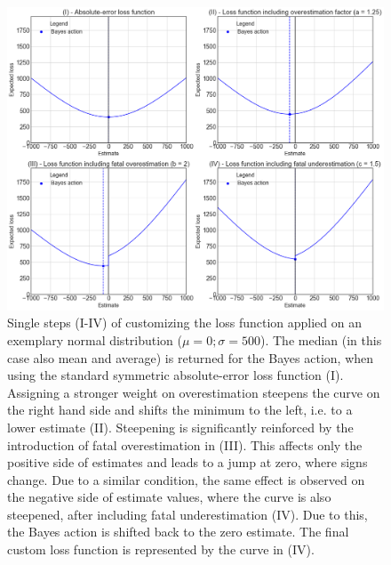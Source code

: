 		\begin{figure}[p!]
			\centering
			\includegraphics[width=1\textwidth]{Figures/LF_4steps_normal.png}
			\caption{Single steps (I-IV) of customizing the loss function applied on an exemplary normal distribution ($\mu=0; \sigma=500$). The median (in this case also mean and average) is returned for the Bayes action, when using the standard symmetric absolute-error loss function (I). Assigning a stronger weight on overestimation steepens the curve on the right hand side and shifts the minimum to the left, i.e. to a lower estimate (II). Steepening is significantly reinforced by the introduction of fatal overestimation in (III). This affects only the positive side of estimates and leads to a jump at zero, where signs change. Due to a similar condition, the same effect is observed on the negative side of estimate values, where the curve is also steepened, after including fatal underestimation (IV). Due to this, the Bayes action is shifted back to the zero estimate. The final custom loss function is represented by the curve in (IV).}\label{fig:LF_4steps_normal}
			\centering
		\end{figure}		

